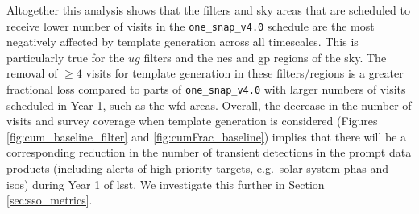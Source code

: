 \documentclass[preprintm,linenumbers]{aastex631}
\newcommand{\baseline}{\texttt{one\_snap\_v4.0}\xspace}
\begin{document}
  Altogether this analysis shows that the filters and sky areas that are scheduled to receive lower number of visits in the \baseline schedule are the most negatively affected by template generation across all timescales.
  This is particularly true for the $ug$ filters and the \gls*{nes} and \gls*{gp} regions of the sky.
  The removal of $\geq4$ visits for template generation in these filters/regions is a greater fractional loss compared to parts of \baseline with larger numbers of visits scheduled in Year 1, such as the \gls*{wfd} areas.
		Overall, the decrease in the number of visits and survey coverage when template generation is considered (Figures \ref{fig:cum_baseline_filter} and \ref{fig:cumFrac_baseline}) implies that there will be a corresponding reduction in the number of transient detections in the prompt data products (including alerts of high priority targets, e.g.\ solar system \glspl*{pha} and \glspl*{iso}) during Year 1 of \gls*{lsst}.
  We investigate this further in Section \ref{sec:sso_metrics}.
		\\

		
		

    			
\end{document}
